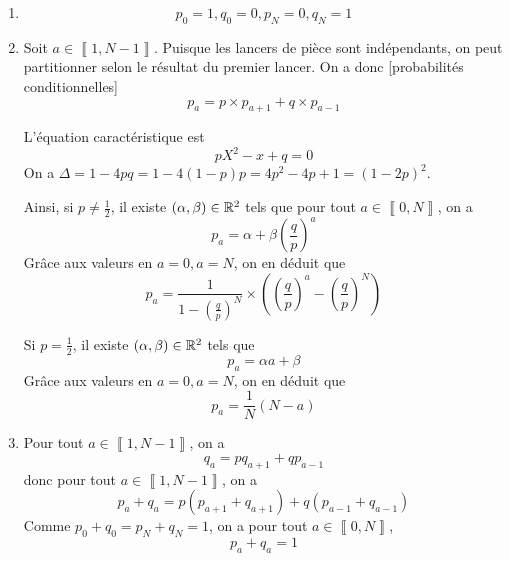 \begin{solution}
    \phantom{}
    \begin{enumerate}
        \item 
        \begin{equation}
            \boxed{p_{0}=1,q_{0}=0,p_{N}=0,q_{N}=1}
        \end{equation}
        \item Soit $a\in\left\llbracket 1,N-1\right\rrbracket$. Puisque les lancers de pièce sont indépendants, on peut partitionner selon le résultat du premier lancer. On a donc [probabilités conditionnelles]
        \begin{equation}
            \boxed{p_{a}=p\times p_{a+1}+q\times p_{a-1}}
        \end{equation}

        L'équation caractéristique est 
        \begin{equation}
            pX^{2}-x+q=0
        \end{equation}
        On a $\Delta=1-4pq=1-4\left(1-p\right)p=4p^{2}-4p+1=\left(1-2p\right)^{2}$.

        Ainsi, si $p\neq\frac{1}{2}$, il existe $\left(\alpha,\beta\right)\in\mathbb{R}^{2}$ tels que pour tout $a\in\left\llbracket 0,N\right\rrbracket$, on a 
        \begin{equation}
            p_{a}=\alpha+\beta\left(\frac{q}{p}\right)^{a}
        \end{equation}
        Grâce aux valeurs en $a=0,a=N$, on en déduit que 
        \begin{equation}
            \boxed{p_{a}=\frac{1}{1-\left(\frac{q}{p}\right)^{N}}\times\left(\left(\frac{q}{p}\right)^{a}-\left(\frac{q}{p}\right)^{N}\right)}
        \end{equation}

        Si $p=\frac{1}{2}$, il existe $\left(\alpha,\beta\right)\in\mathbb{R}^{2}$ tels que 
        \begin{equation}
            p_{a}=\alpha a+\beta
        \end{equation}
        Grâce aux valeurs en $a=0,a=N$, on en déduit que 
        \begin{equation}
            \boxed{p_{a}=\frac{1}{N}\left(N-a\right)}
        \end{equation}

        \item Pour tout $a\in\left\llbracket 1,N-1\right\rrbracket$, on a 
        \begin{equation}
            q_{a}=pq_{a+1}+qp_{a-1}
        \end{equation}
        donc pour tout $a\in\left\llbracket 1,N-1\right\rrbracket$, on a 
        \begin{equation}
            p_{a}+q_{a}=p\left(p_{a+1}+q_{a+1}\right)+q\left(p_{a-1}+q_{a-1}\right)
        \end{equation}
        Comme $p_{0}+q_{0}=p_{N}+q_{N}=1$, on a pour tout $a\in\left\llbracket 0,N\right\rrbracket$,
        \begin{equation}
            \boxed{p_{a}+q_{a}=1}
        \end{equation}


\end{enumerate}
\end{solution}
